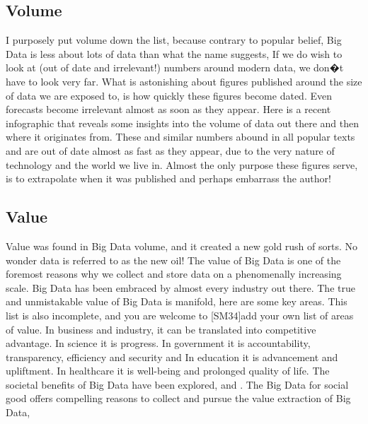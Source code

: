  \subsection{Volume}
I purposely put volume down the list, because contrary to popular belief, Big Data is less about lots of data than what the name suggests, \cite{marr2018much}
If we do wish to look at (out of date and irrelevant!) numbers around modern data, we don�t have to look very far.  What is astonishing about figures published around the size of data we are exposed to, is how quickly these figures become dated.  Even forecasts become irrelevant almost as soon as they appear.  Here is a recent infographic that reveals some insights into the volume of data out there and then where it originates from. 
These and similar numbers abound in all popular texts and are out of date almost as fast as they appear, due to the very nature of technology and the world we live in.  Almost the only purpose these figures serve, is to extrapolate when it was published and perhaps embarrass the author! 
\subsection{Value} 
Value was found in Big Data volume, and it created a new gold rush of sorts.  No wonder data is referred to as the new oil!  The value of Big Data is one of the foremost reasons why we collect and store data on a phenomenally increasing scale.  Big Data has been embraced by almost every industry out there.
The true and unmistakable value of Big Data is manifold, here are some key areas.  This list is also incomplete, and you are welcome to [SM34]add your own list of areas of value.
In business and industry, it can be translated into competitive advantage. 
In science it is progress.
In government it is accountability, transparency, efficiency and security and 
In education it is advancement and upliftment.
In healthcare it is well-being and prolonged quality of life.
The societal benefits of Big Data have been explored, \cite{manovich2011trending} and \cite{coulton2015harnessing}.  The Big Data for social good offers compelling reasons to collect and pursue the value extraction of Big Data, \cite{allen2016protecting} 


